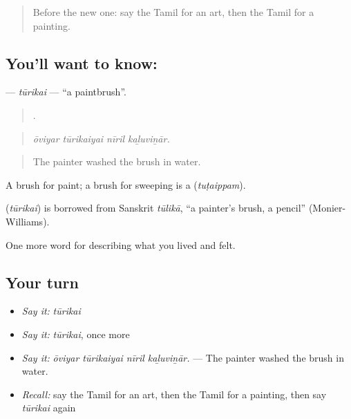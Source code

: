 \label{lesson:TA-C536-turikai}



\begin{quote}
Before the new one: say the Tamil for an art, then the Tamil for a painting.
\end{quote}

\subsection*{You'll want to know: }
\textbf{} — \emph{tūrikai} — \textquotedblleft{}a paintbrush\textquotedblright{}.

\begin{quote}
   .
\end{quote}

\begin{quote}
\emph{ōviyar tūrikaiyai nīril kaḻuviṉār.}
\end{quote}

\begin{quote}
The painter washed the brush in water.
\end{quote}

A brush for paint; a brush for sweeping is a  (\emph{tuṭaippam}).

\begin{cousinweb}
\textbf{} (\emph{tūrikai}) is borrowed from Sanskrit \emph{tūlikā}, \textquotedblleft{}a painter's brush, a pencil\textquotedblright{} (Monier-Williams).
\end{cousinweb}

\begin{grammarlens}[title={What you've built}]
One more word for describing what you lived and felt.
\end{grammarlens}

\subsection*{Your turn}
\begin{itemize}
\raggedright
  \item \emph{Say it:} \emph{tūrikai}
  \item \emph{Say it:} \emph{tūrikai}, once more
  \item \emph{Say it:} \emph{ōviyar tūrikaiyai nīril kaḻuviṉār.} — The painter washed the brush in water.
  \item \emph{Recall:} say the Tamil for an art, then the Tamil for a painting, then say \emph{tūrikai} again
\end{itemize}

